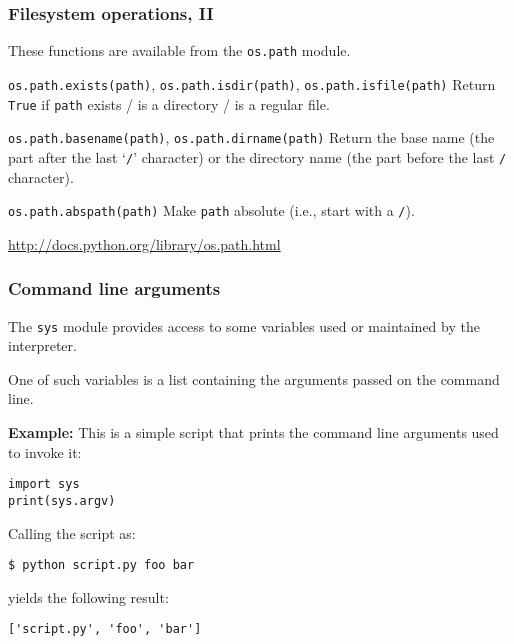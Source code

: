 \documentclass[english,serif,mathserif,xcolor=pdftex,dvipsnames,table]{beamer}
\begin{document}
\begin{frame}[fragile]
  \frametitle{Filesystem operations, II}
  These functions are available from the \texttt{os.path} module.

  \begin{describe}{\lstinline|os.path.exists(path)|, \lstinline|os.path.isdir(path)|, \lstinline|os.path.isfile(path)|}
    Return \texttt{True} if \texttt{path} exists / is a directory / is
    a regular file.
  \end{describe}

  \begin{describe}{\lstinline|os.path.basename(path)|,
      \lstinline|os.path.dirname(path)|}
    Return the base name (the part after the last `\texttt{/}'
    character) or the directory name (the part before the last
    \texttt{/} character).
  \end{describe}

  \begin{describe}{\lstinline|os.path.abspath(path)|}
    Make \texttt{path} absolute (i.e., start with a \texttt{/}).
  \end{describe}

  \begin{references}
    \url{http://docs.python.org/library/os.path.html}
  \end{references}
\end{frame}


\begin{frame}[fragile]
  \frametitle{Command line arguments}
  The \texttt{sys} module provides access to some variables used or
  maintained by the interpreter.

  One of such variables is a list containing the arguments passed on
  the command line.

  \+
  \textbf{Example:} This is a simple script that
  prints the command line arguments used to invoke it:

  \begin{lstlisting}
import sys
print(sys.argv)
  \end{lstlisting}

\+
Calling the script as:
\begin{lstlisting}
$ python script.py foo bar
\end{lstlisting}
yields the following result:
\begin{lstlisting}
['script.py', 'foo', 'bar']
\end{lstlisting}
\end{frame}
\end{document}
